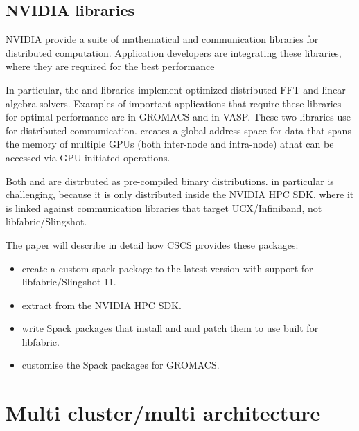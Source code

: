 \subsection{NVIDIA libraries}

NVIDIA provide a suite of mathematical and communication libraries for distributed computation.
Application developers are integrating these libraries, where they are required for the best performance

In particular, the \cufftmp and \cusolvermp libraries implement optimized distributed FFT and linear algebra solvers.
Examples of important applications that require these libraries for optimal performance are \cufftmp in GROMACS and \cusolvermp in VASP.
These two libraries use \nvshmem for distributed communication.
\nvshmem creates a global address space for data that spans the memory of multiple GPUs (both inter-node and intra-node) athat can be accessed via GPU-initiated operations.

Both \cufftmp and \cusolvermp are distrbuted as pre-compiled binary distributions.
\cufftmp in particular is challenging, because it is only distributed inside the NVIDIA HPC SDK, where it is linked against communication libraries that target UCX/Infiniband, not libfabric/Slingshot.

The paper will describe in detail how CSCS provides these packages:
\begin{itemize}
    \item create a custom spack package to the latest version \nvshmem with support for libfabric/Slingshot 11.
    \item extract \cufftmp from the NVIDIA HPC SDK.
    \item write Spack packages that install \cufftmp and \cusolvermp and patch them to use \nvshmem built for libfabric.
    \item customise the Spack packages for GROMACS.
\end{itemize}

\section{Multi cluster/multi architecture}

